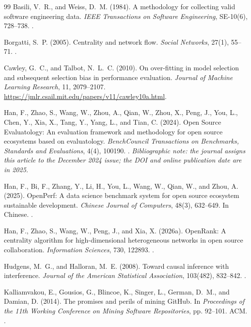 \begin{thebibliography}{99}
\label{refs:chapter03}
Basili, V.~R., and Weiss, D.~M. (1984).
A methodology for collecting valid software engineering data.
\emph{IEEE Transactions on Software Engineering}, SE-10(6), 728--738.
.

Borgatti, S.~P. (2005).
Centrality and network flow.
\emph{Social Networks}, 27(1), 55--71.
.

Cawley, G.~C., and Talbot, N.~L.~C. (2010).
On over-fitting in model selection and subsequent selection bias in performance evaluation.
\emph{Journal of Machine Learning Research}, 11, 2079--2107.
\url{https://jmlr.csail.mit.edu/papers/v11/cawley10a.html}.

Han, F., Zhao, S., Wang, W., Zhou, A., Qian, W., Zhou, X., Peng, J., You, L., Chen, Y., Xia, X., Tang, Y., Yang, L., and Tian, C. (2024).
Open Source Evaluatology: An evaluation framework and methodology for open source ecosystems based on evaluatology.
\emph{BenchCouncil Transactions on Benchmarks, Standards and Evaluations}, 4(4), 100190.
.
\emph{Bibliographic note: the journal assigns this article to the December 2024 issue; the DOI and online publication date are in 2025.}

Han, F., Bi, F., Zhang, Y., Li, H., You, L., Wang, W., Qian, W., and Zhou, A. (2025).
OpenPerf: A data science benchmark system for open source ecosystem sustainable development.
\emph{Chinese Journal of Computers}, 48(3), 632--649. In Chinese.
.

Han, F., Zhao, S., Wang, W., Peng, J., and Xia, X. (2026a).
OpenRank: A centrality algorithm for high-dimensional heterogeneous networks in open source collaboration.
\emph{Information Sciences}, 730, 122893.
.

Hudgens, M.~G., and Halloran, M.~E. (2008).
Toward causal inference with interference.
\emph{Journal of the American Statistical Association}, 103(482), 832--842.
.

Kalliamvakou, E., Gousios, G., Blincoe, K., Singer, L., German, D.~M., and Damian, D. (2014).
The promises and perils of mining GitHub.
In \emph{Proceedings of the 11th Working Conference on Mining Software Repositories}, pp. 92--101. ACM.
.


\end{thebibliography}
